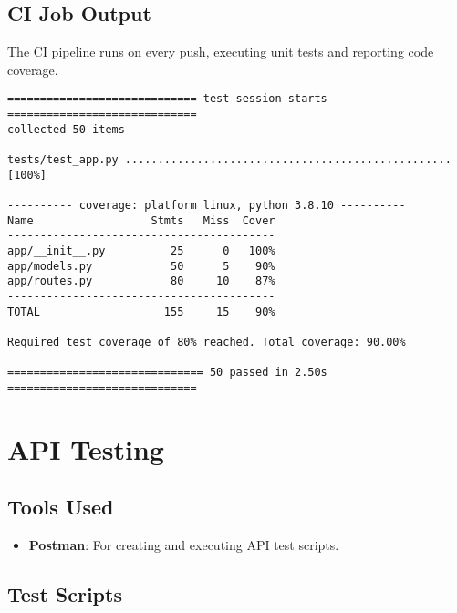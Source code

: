 \documentclass[12pt,a4paper]{report}
\begin{document}
\section{CI Job Output}
The CI pipeline runs on every push, executing unit tests and reporting code coverage.

\begin{verbatim}
============================= test session starts =============================
collected 50 items

tests/test_app.py ..................................................    [100%]

---------- coverage: platform linux, python 3.8.10 ----------
Name                  Stmts   Miss  Cover
-----------------------------------------
app/__init__.py          25      0   100%
app/models.py            50      5    90%
app/routes.py            80     10    87%
-----------------------------------------
TOTAL                   155     15    90%

Required test coverage of 80% reached. Total coverage: 90.00%

============================== 50 passed in 2.50s =============================
\end{verbatim}

\chapter{API Testing}
\section{Tools Used}
\begin{itemize}
    \item \textbf{Postman}: For creating and executing API test scripts.
\end{itemize}

\section{Test Scripts}
\end{document}
